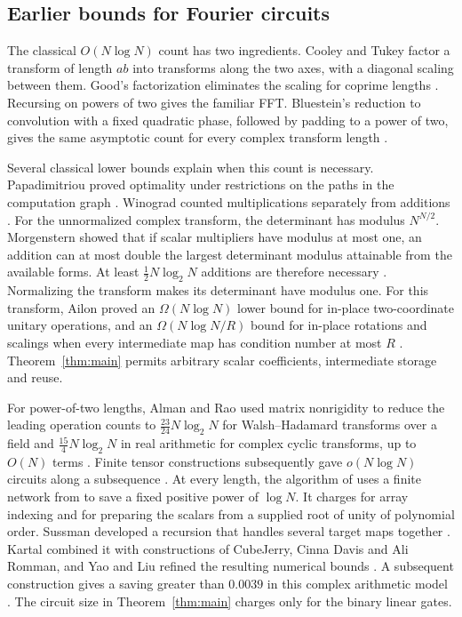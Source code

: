 \subsection{Earlier bounds for Fourier circuits}

The classical $O(N\log N)$ count has two ingredients. Cooley and
Tukey factor a transform of length $ab$ into transforms along the two
axes, with a diagonal scaling between them. Good's factorization
eliminates the scaling for coprime lengths
\cite{Good,CooleyTukey,cooleyLewisWelch1967}. Recursing on powers of
two gives the familiar FFT. Bluestein's reduction to convolution
with a fixed quadratic phase, followed by padding to a power of two,
gives the same asymptotic count for every complex transform length
\cite{Bluestein,rabinerSchaferRader1969}.

Several classical lower bounds explain when this count is necessary.
Papadimitriou proved optimality under restrictions on the paths in
the computation graph \cite{Papadimitriou}. Winograd counted multiplications
separately from additions \cite{Winograd1979DFT}. For the unnormalized
complex transform, the determinant has modulus $N^{N/2}$.
Morgenstern showed that if scalar multipliers have modulus at most one,
an addition can at most double the largest determinant modulus
attainable from the available forms. At least $\tfrac12N\log_2 N$
additions are therefore necessary \cite{Morgenstern}. Normalizing the
transform makes its determinant have modulus one. For this transform,
Ailon proved an $\Omega(N\log N)$ lower bound for in-place
two-coordinate unitary operations, and an $\Omega(N\log N/R)$ bound
for in-place rotations and scalings when every intermediate map has
condition number at most $R$ \cite{Ailon,AilonCondition}.
Theorem~\ref{thm:main} permits arbitrary scalar coefficients,
intermediate storage and reuse.

For power-of-two lengths, Alman and Rao used matrix nonrigidity to
reduce the leading operation counts to $\tfrac{23}{24}N\log_2 N$
for Walsh--Hadamard transforms over a field and $\tfrac{15}{4}N\log_2 N$
in real arithmetic for complex cyclic transforms, up to $O(N)$ terms
\cite{AlmanRao}. Finite tensor constructions subsequently gave
$o(N\log N)$ circuits along a subsequence \cite{FiniteFourier}.
At every length, the algorithm of \cite[Theorem~1.1]{ExplicitFourier}
uses a finite network from \cite[Proposition~8 and Section~3.5]{Tape}
to save a fixed positive power of $\log N$. It charges for array indexing and for preparing the
scalars from a supplied root of unity of polynomial order.
Sussman developed a recursion that handles several target maps
together \cite{Sussman}. Kartal combined it with constructions of
CubeJerry, Cinna Davis and Ali Romman, and Yao and Liu refined the
resulting numerical bounds \cite{Kartal,kartalpi,YaoLiu}. A subsequent
construction gives a saving greater than $0.0039$ in this complex
arithmetic model \cite{RelayFourier}. The circuit size in Theorem~\ref{thm:main}
charges only for the binary linear gates.

